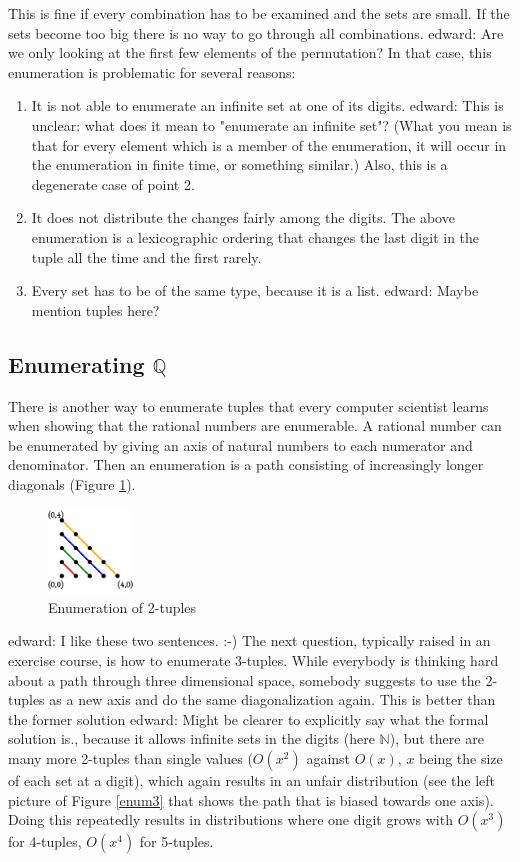 \documentclass{tmr}
\newcommand{\authornote}[3]{{\color{#2} {\sc #1}: #3}}
\newcommand\bay[1]{\authornote{edward}{blue}{#1}}
\begin{document}
This is fine if every combination has to be examined and the sets are small. If the sets become too big there is no way to go through all combinations. \bay{Are we only looking at the first few elements of the permutation?} In that case, this enumeration is problematic for several reasons:
\begin{enumerate}
\item It is not able to enumerate an infinite set at one of its digits. \bay{This is unclear: what does it mean to "enumerate an infinite set"? (What you mean is that for every element which is a member of the enumeration, it will occur in the enumeration in finite time, or something similar.)  Also, this is a degenerate case of point 2.}
\item It does not distribute the changes fairly among the digits. The above enumeration is a lexicographic ordering that changes the last digit in the tuple all the time and the first rarely.
\item Every set has to be of the same type, because it is a list. \bay{Maybe mention tuples here?}
\end{enumerate}

\subsection{Enumerating $\mathbb{Q} $}
There is another way to enumerate tuples that every computer scientist learns when showing that the rational numbers are enumerable. A rational number can be enumerated by giving an axis of natural numbers to each numerator and denominator. Then an enumeration is a path consisting of increasingly longer diagonals (Figure \ref{enum2}).

\begin{figure}[htbp]
  \centering
     \includegraphics[width=0.2\textwidth]{enum2c.pdf}
  \caption{Enumeration of 2-tuples}
  \label{enum2}
\end{figure}

\bay{I like these two sentences. :-)} The next question, typically raised in an exercise course, is how to enumerate 3-tuples.
While everybody is thinking hard about a path through three dimensional space, somebody suggests to use the 2-tuples as a new axis and do the same diagonalization again. This is better than the former solution \bay{Might be clearer to explicitly say what the formal solution is.}, because it allows infinite sets in the digits (here $\mathbb{N}$), but there are many more 2-tuples  than single values ($O(x^2)$ against $O(x)$, $x$ being the size of each set at a digit), which again results in an unfair distribution (see the left picture of Figure \ref{enum3} that shows the path that is biased towards one axis). Doing this repeatedly results in distributions where one digit grows with $O(x^3)$ for 4-tuples, $O(x^4)$ for 5-tuples.
\end{document}
